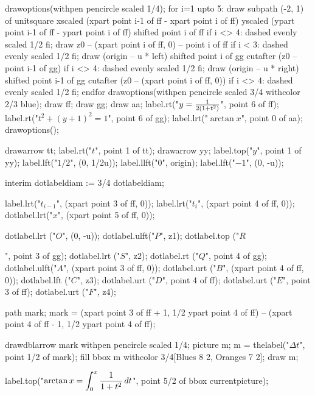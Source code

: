 \documentclass[oneside]{scrbook}
\begin{document}
drawoptions(withpen pencircle scaled 1/4);
for i=1 upto 5:
    draw subpath (-2, 1) of unitsquare 
        xscaled (xpart point i-1 of ff - xpart point i of ff)
        yscaled (ypart point i-1 of ff - ypart point i of ff)
        shifted point i of ff
        if i <> 4: dashed evenly scaled 1/2 fi;
    draw z0
        -- (xpart point i of ff, 0) 
        -- point i of ff 
        if i < 3: dashed evenly scaled 1/2 fi;
    draw (origin -- u * left) shifted point i of gg
        cutafter (z0 -- point i-1 of gg)
        if i <> 4: dashed evenly scaled 1/2 fi;
    draw (origin -- u * right) shifted point i-1 of gg
        cutafter (z0 -- (xpart point i of ff, 0))
        if i <> 4: dashed evenly scaled 1/2 fi;
endfor
drawoptions(withpen pencircle scaled 3/4 withcolor 2/3 blue);
draw ff; draw gg; draw aa;
label.rt("$y={1\over 2\left(1+t^2\right)}$", point 6 of ff);
label.rt("$t^2 + \left(y+1\right)^2=1$", point 6 of gg);
label.lrt("$\arctan x$", point 0 of aa);
drawoptions();

drawarrow tt; label.rt("$t$", point 1 of tt);
drawarrow yy; label.top("$y$", point 1 of yy);
label.lft("$1/2$", (0, 1/2u));
label.llft("$0$", origin);
label.lft("$-1$", (0, -u));

interim dotlabeldiam := 3/4 dotlabeldiam;

label.lrt("$t_{i-1}$", (xpart point 3 of ff, 0));
label.lrt("$t_{i}$", (xpart point 4 of ff, 0));
dotlabel.lrt("$x$", (xpart point 5 of ff, 0));

dotlabel.lrt ("$\scriptstyle O$", (0, -u));
dotlabel.ulft("$\scriptstyle P$", z1);
dotlabel.top ("$\scriptstyle R$\strut", point 3 of gg);
dotlabel.lrt ("$\scriptstyle S$", z2);
dotlabel.rt  ("$\scriptstyle Q$", point 4 of gg);
dotlabel.ulft("$\scriptstyle A$", (xpart point 3 of ff, 0));
dotlabel.urt ("$\scriptstyle B$", (xpart point 4 of ff, 0));
dotlabel.lft ("$\scriptstyle C$", z3);
dotlabel.urt ("$\scriptstyle D$", point 4 of ff);
dotlabel.urt ("$\scriptstyle E$", point 3 of ff);
dotlabel.urt ("$\scriptstyle F$", z4);

path mark; mark = (xpart point 3 of ff + 1, 1/2 ypart point 4 of ff)
               -- (xpart point 4 of ff - 1, 1/2 ypart point 4 of ff);

drawdblarrow mark withpen pencircle scaled 1/4;
picture m; m = thelabel("$\Delta t$", point 1/2 of mark);
fill bbox m withcolor 3/4[Blues 8 2, Oranges 7 2];
draw m;

label.top("$\displaystyle \arctan x = \int_0^x{1\over 1+t^2}\,dt$", point 5/2 of bbox currentpicture);
\end{document}
